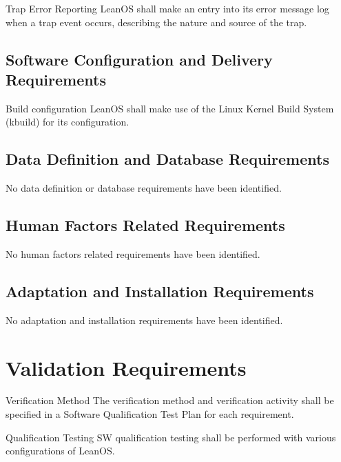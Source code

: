  {Trap Error Reporting}{%
LeanOS shall make an entry into its error message log when a trap event occurs,
describing the nature and source of the trap.
}{
}



\section{Software Configuration and Delivery Requirements}

 {Build configuration}{%
LeanOS shall make use of the Linux Kernel Build System (kbuild) for its
configuration.
}{}%


\section{Data Definition and Database Requirements}

No data definition or database requirements have been identified.


\section{Human Factors Related Requirements}

No human factors related requirements have been identified.

\section{Adaptation and Installation Requirements}

No adaptation and installation requirements have been identified.


\chapter{Validation Requirements}

 {Verification Method}{%
The verification method and verification activity shall be specified 
in a Software Qualification Test Plan for each requirement.
}{}%

 {Qualification Testing}{%
SW qualification testing shall be performed with various configurations of
LeanOS.
}{}%



